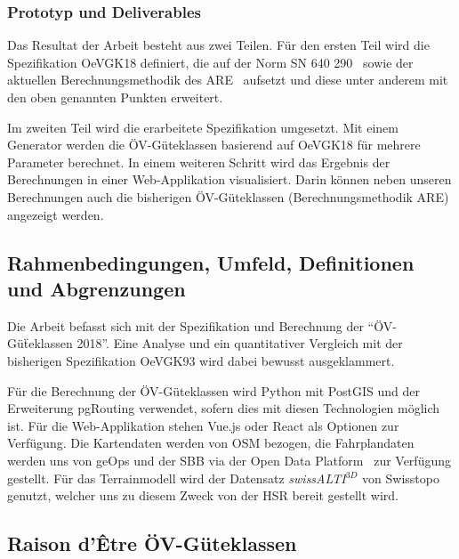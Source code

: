 \subsubsection{Prototyp und Deliverables}
\label{Ziele und Unterziele:Prototyp und Deliverables}

Das Resultat der Arbeit besteht aus zwei Teilen.
Für den ersten Teil wird die Spezifikation \gls{OeVGK18} definiert, die auf der Norm SN 640 290~\cite{sn640290} sowie der aktuellen Berechnungsmethodik des \acs{ARE}~\cite{berechnung_are} aufsetzt und diese unter anderem mit den oben genannten Punkten erweitert.

Im zweiten Teil wird die erarbeitete Spezifikation umgesetzt.
Mit einem Generator werden die \acs{ÖV}-Güteklassen basierend auf \gls{OeVGK18} für mehrere Parameter berechnet.
In einem weiteren Schritt wird das Ergebnis der Berechnungen in einer Web-Applikation visualisiert.
Darin können neben unseren Berechnungen auch die bisherigen \acs{ÖV}-Güteklassen (Berechnungsmethodik \acs{ARE}) angezeigt werden.

\subsection{Rahmenbedingungen, Umfeld, Definitionen und Abgrenzungen}
\label{Einführung:Rahmenbedingungen, Umfeld, Definitionen, Abgrenzungen}

Die Arbeit befasst sich mit der Spezifikation und Berechnung der "`ÖV-Güẗeklassen 2018"'.
Eine Analyse und ein quantitativer Vergleich mit der bisherigen Spezifikation \gls{OeVGK93} wird dabei bewusst ausgeklammert.

Für die Berechnung der ÖV-Güteklassen wird Python mit PostGIS und der Erweiterung pgRouting verwendet, sofern dies mit diesen Technologien möglich ist.
Für die Web-Applikation stehen Vue.js oder React als Optionen zur Verfügung. Die Kartendaten werden von \ac{OSM} bezogen, die Fahrplandaten werden uns von geOps und der SBB via der Open Data Platform~\cite{sbb_open_transport_data} zur Verfügung gestellt.
Für das \gls{Terrainmodell} wird der Datensatz \emph{swissALTI$^{3D}$} von Swisstopo~\cite{swissalti3d_swisstopo} genutzt, welcher uns zu diesem Zweck von der HSR bereit gestellt wird.

\subsection{Raison d'Être ÖV-Güteklassen}
\label{Rahmenbedingungen, Umfeld, Definitionen, Abgrenzungen:Raison d’Être ÖV-Güteklassen}

